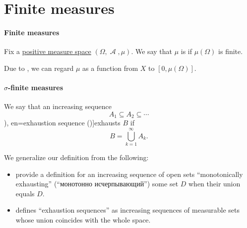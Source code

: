 \section{Finite measures}\label{sec:finite_measures}

\paragraph{Finite measures}

\begin{definition}\label{def:finite_measure}
  Fix a \hyperref[def:measure/positive]{positive measure space} \( (\Omega, \mscrA, \mu) \). We say that \( \mu \) is  if \( \mu(\Omega) \) is finite.

  Due to , we can regard \( \mu \) as a function from \( X \) to \( [0, \mu(\Omega)] \).
\end{definition}

\paragraph{\( \sigma \)-finite measures}

\begin{definition}\label{def:exhausting_sequence}\mimprovised
  We say that an increasing sequence
  \begin{equation*}
    A_1 \subseteq A_2 \subseteq \cdots
  \end{equation*}
  \term[ru=монотонно исчерпывает (\cite[def. 3.8.1]{ИльинСадовничийСендов1987АнализТом2}), en=exhaustion sequence (\cite[13]{Malliavin1995Probability})]{exhausts} \( B \) if
  \begin{equation*}
    B = \bigcup_{k=1}^\infty A_k.
  \end{equation*}
\end{definition}
\begin{comments}
  \item We generalize our definition from the following:
  \begin{itemize}
    \item {} provide a definition for an increasing sequence of open sets \enquote{monotonically exhausting} (\enquote{монотонно исчерпывающий}) some set \( D \) when their union equals \( D \).

    \item {} defines \enquote{exhaustion sequences} as increasing sequences of measurable sets whose union coincides with the whole space.
  \end{itemize}
\end{comments}

